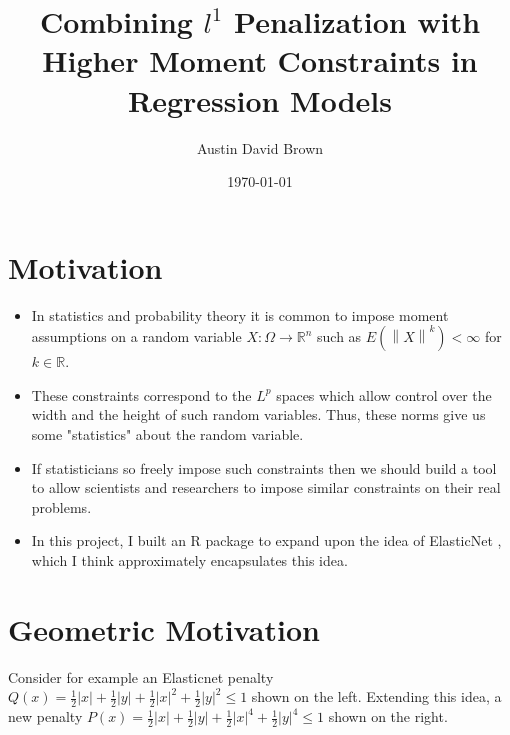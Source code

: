 \documentclass[10pt, reqno]{article}
\numberwithin{equation}{section}
\newcommand{\norm}[1]{\left\lVert#1\right\rVert}
\newcommand{\R}{\mathbb{R}}
\begin{document}
\setlength{\footskip}{-1cm}
 

\title{Combining $l^1$ Penalization with Higher Moment Constraints in Regression Models}
\author{Austin David Brown}
\date{\today}

\maketitle

\newpage
\section*{Motivation}

\begin{itemize}

\item In statistics and probability theory it is common to impose moment assumptions on a random variable $X : \Omega \to \R^n$ such as $E(\norm{X}^k) < \infty$ for $k \in \R$.

\item These constraints correspond to the $L^p$ spaces which allow control over the width and the height of such random variables.
Thus, these norms give us some "statistics" about the random variable.

\item If statisticians so freely impose such constraints then we should build a tool to allow scientists and researchers to impose similar constraints on their real problems.

\item  In this project, I built an R package to expand upon the idea of ElasticNet \cite{elasticnet}, which I think approximately encapsulates this idea.

\end{itemize}

\newpage
\section*{Geometric Motivation}
Consider for example an Elasticnet \cite{elasticnet} penalty $Q(x) = \frac{1}{2} |x| + \frac{1}{2} |y| + \frac{1}{2} |x|^2 + \frac{1}{2} |y|^2 \le 1$
shown on the left. Extending this idea, a new penalty $P(x) = \frac{1}{2} |x| + \frac{1}{2} |y| + \frac{1}{2} |x|^4 + \frac{1}{2} |y|^4 \le 1$ shown on the right.
\end{document}
